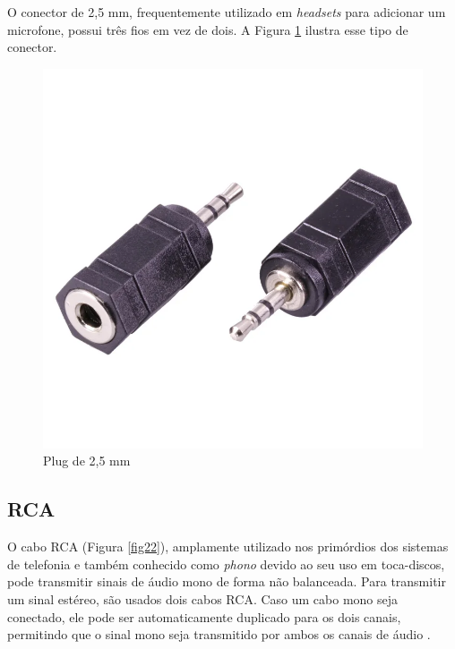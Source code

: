O conector de 2,5 mm, frequentemente utilizado em \textit{headsets} para adicionar um microfone, possui três fios em vez de dois. A Figura \ref{fig21} ilustra esse tipo de conector.

\begin{figure}[h]
	\centering
    \includegraphics[scale=0.2]{figuras/fig21.png}
	\caption{Plug de 2,5 mm \cite{mouser}}
	\label{fig21}
\end{figure}

\subsection{RCA}

O cabo RCA (Figura \ref{fig22}), amplamente utilizado nos primórdios dos sistemas de telefonia e também conhecido como \textit{phono} devido ao seu uso em toca-discos, pode transmitir sinais de áudio mono de forma não balanceada. Para transmitir um sinal estéreo, são usados dois cabos RCA. Caso um cabo mono seja conectado, ele pode ser automaticamente duplicado para os dois canais, permitindo que o sinal mono seja transmitido por ambos os canais de áudio \cite{bartlett}.

